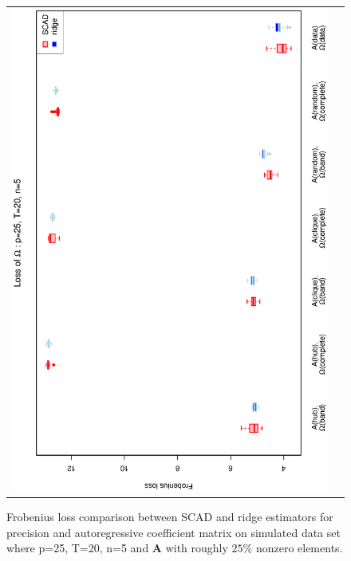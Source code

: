 \documentclass[a4paper]{article}
\begin{document}
\begin{figure}[h!]
\begin{tabular}{cc}
\includegraphics[scale=0.45,angle=270]{LossOmega25T20N5_25.eps}
\end{tabular}
\caption{Frobenius loss comparison between SCAD and ridge estimators for precision and autoregressive coefficient matrix on simulated data set where p=25, T=20, n=5 and $\mathbf{A}$ with roughly $25\%$ nonzero elements.}
\label{figSM:Loss25T20N5_25}
\end{figure}

\end{document}
